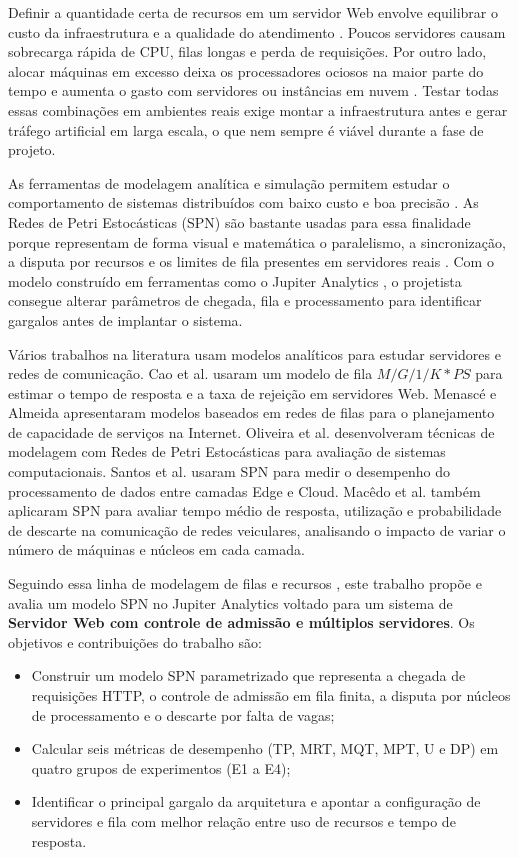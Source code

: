 \documentclass[conference,10pt]{IEEEtran}
\begin{document}
Definir a quantidade certa de recursos em um servidor Web envolve equilibrar o custo da infraestrutura e a qualidade do atendimento \cite{santos2021}. Poucos servidores causam sobrecarga rápida de CPU, filas longas e perda de requisições. Por outro lado, alocar máquinas em excesso deixa os processadores ociosos na maior parte do tempo e aumenta o gasto com servidores ou instâncias em nuvem \cite{macedo2022}. Testar todas essas combinações em ambientes reais exige montar a infraestrutura antes e gerar tráfego artificial em larga escala, o que nem sempre é viável durante a fase de projeto.

As ferramentas de modelagem analítica e simulação permitem estudar o comportamento de sistemas distribuídos com baixo custo e boa precisão \cite{bolch2006}. As Redes de Petri Estocásticas (SPN) são bastante usadas para essa finalidade porque representam de forma visual e matemática o paralelismo, a sincronização, a disputa por recursos e os limites de fila presentes em servidores reais \cite{marsan1995, oliveira2017}. Com o modelo construído em ferramentas como o Jupiter Analytics \cite{jupiter2024}, o projetista consegue alterar parâmetros de chegada, fila e processamento para identificar gargalos antes de implantar o sistema.

Vários trabalhos na literatura usam modelos analíticos para estudar servidores e redes de comunicação. Cao et al. \cite{cao2003} usaram um modelo de fila $M/G/1/K*PS$ para estimar o tempo de resposta e a taxa de rejeição em servidores Web. Menascé e Almeida \cite{menasce2002} apresentaram modelos baseados em redes de filas para o planejamento de capacidade de serviços na Internet. Oliveira et al. \cite{oliveira2017} desenvolveram técnicas de modelagem com Redes de Petri Estocásticas para avaliação de sistemas computacionais. Santos et al. \cite{santos2021} usaram SPN para medir o desempenho do processamento de dados entre camadas Edge e Cloud. Macêdo et al. \cite{macedo2022} também aplicaram SPN para avaliar tempo médio de resposta, utilização e probabilidade de descarte na comunicação de redes veiculares, analisando o impacto de variar o número de máquinas e núcleos em cada camada.

Seguindo essa linha de modelagem de filas e recursos \cite{macedo2022, oliveira2017}, este trabalho propõe e avalia um modelo SPN no Jupiter Analytics voltado para um sistema de \textbf{Servidor Web com controle de admissão e múltiplos servidores}. Os objetivos e contribuições do trabalho são:
\begin{itemize}
    \item Construir um modelo SPN parametrizado que representa a chegada de requisições HTTP, o controle de admissão em fila finita, a disputa por núcleos de processamento e o descarte por falta de vagas;
    \item Calcular seis métricas de desempenho (TP, MRT, MQT, MPT, U e DP) em quatro grupos de experimentos (E1 a E4);
    \item Identificar o principal gargalo da arquitetura e apontar a configuração de servidores e fila com melhor relação entre uso de recursos e tempo de resposta.
\end{itemize}
\end{document}
